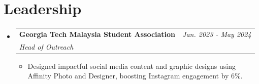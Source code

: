\documentclass[letterpaper,11pt]{article}
\makeatletter
\newcommand{\resumeItem}[1]{
  \item\small{
    {#1 \vspace{-2pt}}
  }
}
\newcommand{\resumeSubheading}[4]{
  \vspace{-2pt}\item
    \begin{tabular*}{0.97\textwidth}[t]{l@{\extracolsep{\fill}}r}
      \textbf{#1} & #2 \\
      \textit{\small#3} & \textit{\small #4} \\
    \end{tabular*}\vspace{-7pt}
}
\newcommand{\resumeSubHeadingListStart}{\begin{itemize}[leftmargin=0.15in, label={}]}
\newcommand{\resumeSubHeadingListEnd}{\end{itemize}}
\newcommand{\resumeItemListStart}{\begin{itemize}}
\newcommand{\resumeItemListEnd}{\end{itemize}\vspace{-8pt}}
\makeatother
\begin{document}





\section{Leadership}
    \resumeSubHeadingListStart
      \resumeSubheading
      {Georgia Tech Malaysia Student Association}{\textit{Jan. 2023 - May 2024}}
      {Head of Outreach}{}
      \resumeItemListStart
        \resumeItem{Designed impactful social media content and graphic designs using Affinity Photo and Designer, boosting Instagram engagement by 6\%.}
      \resumeItemListEnd
    \resumeSubHeadingListEnd
\end{document}
